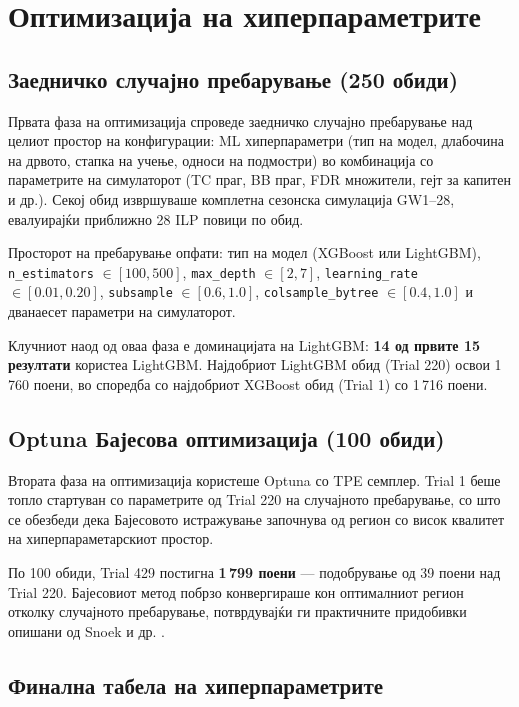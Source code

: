 \section{Оптимизација на хиперпараметрите}

\subsection{Заедничко случајно пребарување (250 обиди)}

Првата фаза на оптимизација спроведе заедничко случајно пребарување над целиот простор на конфигурации: ML хиперпараметри (тип на модел, длабочина на дрвото, стапка на учење, односи на подмостри) во комбинација со параметрите на симулаторот (TC праг, BB праг, FDR множители, гејт за капитен и др.). Секој обид извршуваше комплетна сезонска симулација GW1--28, евалуирајќи приближно 28 ILP повици по обид.

Просторот на пребарување опфати: тип на модел (XGBoost или LightGBM), \texttt{n\_estimators} $\in [100, 500]$, \texttt{max\_depth} $\in [2, 7]$, \texttt{learning\_rate} $\in [0.01, 0.20]$, \texttt{subsample} $\in [0.6, 1.0]$, \texttt{colsample\_bytree} $\in [0.4, 1.0]$ и дванаесет параметри на симулаторот.

Клучниот наод од оваа фаза е доминацијата на LightGBM: \textbf{14 од првите 15 резултати} користеа LightGBM. Најдобриот LightGBM обид (Trial 220) освои 1\,760 поени, во споредба со најдобриот XGBoost обид (Trial 1) со 1\,716 поени.

\subsection{Optuna Бајесова оптимизација (100 обиди)}

Втората фаза на оптимизација користеше Optuna \cite{akiba2019optuna} со TPE семплер. Trial 1 беше топло стартуван со параметрите од Trial 220 на случајното пребарување, со што се обезбеди дека Бајесовото истражување започнува од регион со висок квалитет на хиперпараметарскиот простор.

По 100 обиди, Trial 429 постигна \textbf{1\,799 поени} — подобрување од 39 поени над Trial 220. Бајесовиот метод побрзо конвергираше кон оптималниот регион отколку случајното пребарување, потврдувајќи ги практичните придобивки опишани од Snoek и др. \cite{snoek2012practical}.

\subsection{Финална табела на хиперпараметрите}

